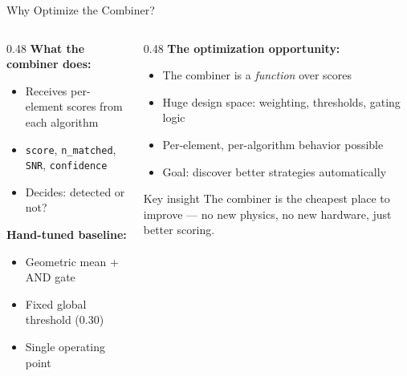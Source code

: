 \documentclass[aspectratio=169,12pt]{beamer}
\begin{document}
\begin{frame}{Why Optimize the Combiner?}
  \begin{columns}[T]
    \begin{column}{0.48\textwidth}
      \textbf{What the combiner does:}
      \begin{itemize}
        \item Receives per-element scores from each algorithm
        \item \texttt{score}, \texttt{n\_matched}, \texttt{SNR}, \texttt{confidence}
        \item Decides: detected or not?
      \end{itemize}

      \vspace{0.5em}
      \textbf{Hand-tuned baseline:}
      \begin{itemize}
        \item Geometric mean + AND gate
        \item Fixed global threshold (0.30)
        \item Single operating point
      \end{itemize}
    \end{column}
    \begin{column}{0.48\textwidth}
      \textbf{The optimization opportunity:}
      \begin{itemize}
        \item The combiner is a \emph{function} over scores
        \item Huge design space: weighting, thresholds, gating logic
        \item Per-element, per-algorithm behavior possible
        \item \alert{Goal:} discover better strategies automatically
      \end{itemize}

      \vspace{0.5em}
      \begin{block}{Key insight}
        The combiner is the cheapest place to improve ---
        no new physics, no new hardware, just better scoring.
      \end{block}
    \end{column}
  \end{columns}
\end{frame}
\end{document}
